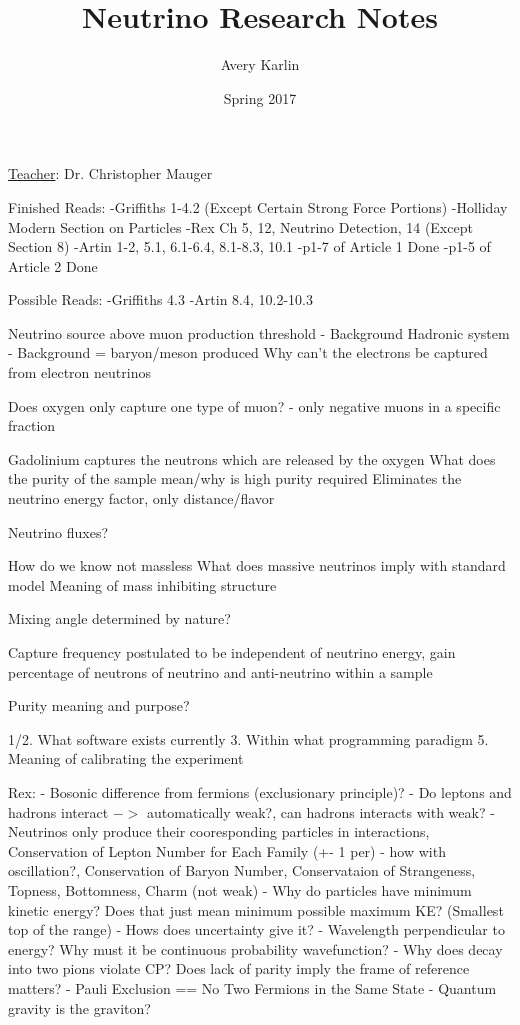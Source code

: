 \documentclass[11 pt, twoside]{article}
\begin{document}
\title{Neutrino Research Notes}
\author{Avery Karlin}
\date{Spring 2017}
\newcommand{\teacher}{Dr. Christopher Mauger}

\maketitle
\newpage
\hypertarget{content}{\tableofcontents}
\vspace{11pt}
\noindent
\underline{Teacher}: \teacher
\newpage

Finished Reads: 
	-Griffiths 1-4.2 (Except Certain Strong Force Portions)
	-Holliday Modern Section on Particles
	-Rex Ch 5, 12, Neutrino Detection, 14 (Except Section 8)
	-Artin 1-2, 5.1, 6.1-6.4, 8.1-8.3, 10.1
	-p1-7 of Article 1 Done
	-p1-5 of Article 2 Done

Possible Reads:
	-Griffiths 4.3
	-Artin 8.4, 10.2-10.3

Neutrino source above muon production threshold - Background
Hadronic system - Background = baryon/meson produced
Why can't the electrons be captured from electron neutrinos

Does oxygen only capture one type of muon? - only negative muons in a specific fraction

Gadolinium captures the neutrons which are released by the oxygen
What does the purity of the sample mean/why is high purity required
Eliminates the neutrino energy factor, only distance/flavor

Neutrino fluxes?

How do we know not massless
What does massive neutrinos imply with standard model
Meaning of mass inhibiting structure

Mixing angle determined by nature?

Capture frequency postulated to be independent of neutrino energy, gain percentage of neutrons of neutrino and anti-neutrino within a sample

Purity meaning and purpose?

1/2. What software exists currently
3. Within what programming paradigm
5. Meaning of calibrating the experiment

Rex:
- Bosonic difference from fermions (exclusionary principle)?
- Do leptons and hadrons interact $->$ automatically weak?, can hadrons interacts with weak?
- Neutrinos only produce their cooresponding particles in interactions, Conservation of Lepton Number for Each Family (+- 1 per) - how with oscillation?, Conservation of Baryon Number, Conservataion of Strangeness, Topness, Bottomness, Charm (not weak)
- Why do particles have minimum kinetic energy? Does that just mean minimum possible maximum KE? (Smallest top of the range) - Hows does uncertainty give it?
- Wavelength perpendicular to energy? Why must it be continuous probability wavefunction?
- Why does decay into two pions violate CP? Does lack of parity imply the frame of reference matters?
- Pauli Exclusion == No Two Fermions in the Same State
- Quantum gravity is the graviton?
\end{document}
